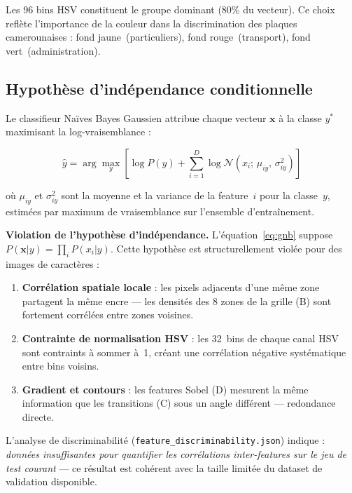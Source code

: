 Les 96 bins HSV constituent le groupe dominant (80\% du vecteur). Ce choix
reflète l'importance de la couleur dans la discrimination des plaques
camerounaises : fond jaune~(particuliers), fond rouge~(transport), fond
vert~(administration).

\subsection{Hypothèse d'indépendance conditionnelle}

Le classifieur Naïves Bayes Gaussien attribue chaque vecteur $\mathbf{x}$
à la classe $y^*$ maximisant la log-vraisemblance :

\begin{equation}
  \hat{y} = \arg\max_{y} \left[
    \log P(y) + \sum_{i=1}^{D}
    \log \mathcal{N}\!\left(x_i;\, \mu_{iy},\, \sigma^2_{iy}\right)
  \right]
  \label{eq:gnb}
\end{equation}

où $\mu_{iy}$ et $\sigma^2_{iy}$ sont la moyenne et la variance de la
feature~$i$ pour la classe~$y$, estimées par maximum de vraisemblance sur
l'ensemble d'entraînement.

\medskip
\textbf{Violation de l'hypothèse d'indépendance.} L'équation~\eqref{eq:gnb}
suppose $P(\mathbf{x}|y) = \prod_i P(x_i|y)$. Cette hypothèse est
structurellement violée pour des images de caractères :

\begin{enumerate}
  \item \textbf{Corrélation spatiale locale} : les pixels adjacents d'une même
    zone partagent la même encre — les densités des 8 zones de la grille (B)
    sont fortement corrélées entre zones voisines.
  \item \textbf{Contrainte de normalisation HSV} : les 32~bins de chaque canal
    HSV sont contraints à sommer à~1, créant une corrélation négative
    systématique entre bins voisins.
  \item \textbf{Gradient et contours} : les features Sobel (D) mesurent la
    même information que les transitions (C) sous un angle différent —
    redondance directe.
\end{enumerate}

L'analyse de discriminabilité (\texttt{feature\_discriminability.json})
indique : \textit{données insuffisantes pour quantifier les corrélations
inter-features sur le jeu de test courant} — ce résultat est cohérent avec
la taille limitée du dataset de validation disponible.

